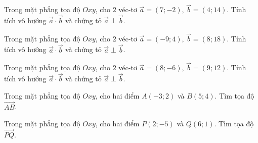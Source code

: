 \begin{bt}%
Trong mặt phẳng tọa độ $Oxy$, cho $2$ véc-tơ $\overrightarrow{a}=(7;-2)$, $\overrightarrow{b}=(4;14)$. Tính tích vô hướng $\overrightarrow{a}\cdot \overrightarrow{b}$ và chứng tỏ $\overrightarrow{a}\perp\overrightarrow{b}$.
\end{bt}

\begin{bt}%
Trong mặt phẳng tọa độ $Oxy$, cho $2$ véc-tơ $\overrightarrow{a}=(-9;4)$, $\overrightarrow{b}=(8;18)$. Tính tích vô hướng $\overrightarrow{a}\cdot \overrightarrow{b}$ và chứng tỏ $\overrightarrow{a}\perp\overrightarrow{b}$.
\end{bt}

\begin{bt}%
	Trong mặt phẳng tọa độ $Oxy$, cho $2$ véc-tơ $\overrightarrow{a}=(8;-6)$, $\overrightarrow{b}=(9;12)$. Tính tích vô hướng $\overrightarrow{a}\cdot \overrightarrow{b}$ và chứng tỏ $\overrightarrow{a}\perp\overrightarrow{b}$.
\end{bt}

\begin{bt}%
Trong mặt phẳng tọa độ $Oxy$, cho hai điểm $A(-3; 2)$ và $B(5; 4)$. Tìm tọa độ $\overrightarrow{AB}$.
\end{bt}

\begin{bt}%
Trong mặt phẳng tọa độ $Oxy$, cho hai điểm $P(2; -5)$ và $Q(6; 1)$. Tìm tọa độ $\overrightarrow{PQ}$.
\end{bt}

